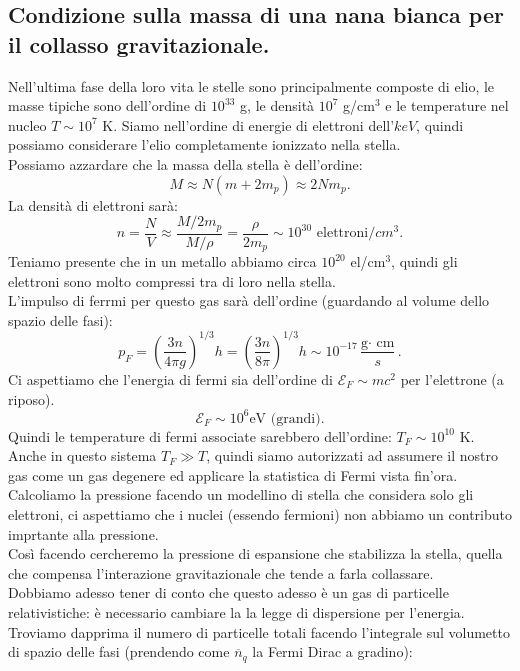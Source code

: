 \subsection{Condizione sulla massa di una nana bianca per il collasso gravitazionale.}%
Nell'ultima fase della loro vita le stelle sono principalmente composte di elio, le masse tipiche sono dell'ordine di $10^{33}$ g, le densità $10^{7}$ g/cm$^3$ e le temperature nel nucleo $T \sim 10^{7}$ K.  Siamo nell'ordine di energie di elettroni dell'$keV$, quindi possiamo considerare l'elio completamente ionizzato nella stella. \\
Possiamo azzardare che la massa della stella è dell'ordine:
\[
	M \approx N\left( m + 2m_{p} \right) \approx 2Nm_{p} 
.\] 
La densità di elettroni sarà:
\[
	n = \frac{N}{V} \approx \frac{M /2m_{p}}{M / \rho }= \frac{\rho}{2m_{p}} \sim 10^{30} \text{ elettroni}/cm^3
.\] 
Teniamo presente che in un metallo abbiamo circa $10^{20}$ el/cm$^3$, quindi gli elettroni sono molto compressi tra di loro nella stella.\\
L'impulso di ferrmi per questo gas sarà dell'ordine (guardando al volume dello spazio delle fasi):
\[
	p_{F} = \left( \frac{3n}{4\pi g} \right) ^{1 /3} h = \left( \frac{3n}{8\pi} \right) ^{1 /3} h \sim 10^{-17} \frac{\text{g} \cdot \text{ cm}}{s}
.\] 
Ci aspettiamo che l'energia di fermi sia dell'ordine di $\mathcal{E} _{F} \sim  mc^2$ per l'elettrone (a riposo). 
\[
	\mathcal{E} _{F} \sim  10^{6} \text{eV (grandi)}
.\] 
Quindi le temperature di fermi associate sarebbero dell'ordine: $T_{F} \sim 10^{10}$ K.\\
Anche in questo sistema $T_{F} \gg T$, quindi siamo autorizzati ad assumere il nostro gas come un gas degenere ed applicare la statistica di Fermi vista fin'ora.\\
Calcoliamo la pressione facendo un modellino di stella che considera solo gli elettroni, ci aspettiamo che i nuclei (essendo fermioni) non abbiamo un contributo imprtante alla pressione.\\
Così facendo cercheremo la pressione di espansione che stabilizza la stella, quella che compensa l'interazione gravitazionale che tende a farla collassare.\\
Dobbiamo adesso tener di conto che questo adesso è un gas di particelle relativistiche: è necessario cambiare la la legge di dispersione per l'energia.\\
Troviamo dapprima il numero di particelle totali facendo l'integrale sul volumetto di spazio delle fasi (prendendo come $\overline{n}_{q}$ la Fermi Dirac a gradino):
